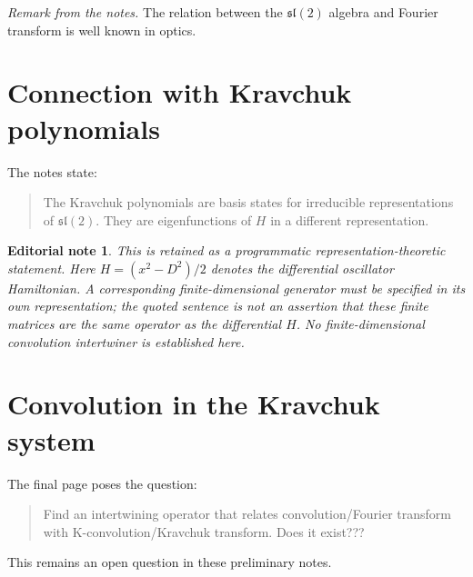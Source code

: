 \documentclass[11pt]{amsart}
\newtheorem*{editorial}{Editorial note}
\begin{document}
\medskip
\noindent\textit{Remark from the notes.}
The relation between the $\mathfrak{sl}(2)$ algebra and Fourier
transform is well known in optics.

\section{Connection with Kravchuk polynomials}
The notes state:
\begin{quote}
The Kravchuk polynomials are basis states for irreducible
representations of $\mathfrak{sl}(2)$. They are eigenfunctions of
$H$ in a different representation.
\end{quote}
\begin{editorial}
This is retained as a programmatic representation-theoretic statement.
Here $H=(x^2-D^2)/2$ denotes the differential oscillator Hamiltonian.
A corresponding finite-dimensional generator must be specified in its
own representation; the quoted sentence is not an assertion that these
finite matrices are the same operator as the differential $H$.
No finite-dimensional convolution intertwiner is established here.
\end{editorial}

\section{Convolution in the Kravchuk system}
The final page poses the question:
\begin{quote}
Find an intertwining operator that relates convolution/Fourier
transform with K-convolution/Kravchuk transform. Does it exist???
\end{quote}
This remains an open question in these preliminary notes.

\appendix
\end{document}
